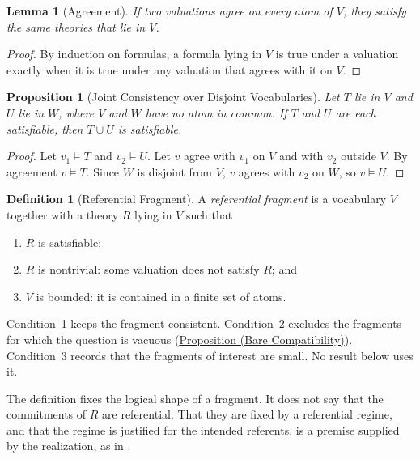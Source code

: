 \documentclass[11pt]{article}
\theoremstyle{plain}
\newtheorem{lemma}[theorem]{Lemma}
\newtheorem{proposition}[theorem]{Proposition}
\theoremstyle{definition}
\newtheorem{definition}[theorem]{Definition}
\theoremstyle{remark}
\newcommand{\PropRef}[2]{\hyperref[#1]{Proposition (#2)}}
\begin{document}
\begin{lemma}[Agreement]
  If two valuations agree on every atom of $V$, they satisfy the same theories
  that lie in $V$.
\end{lemma}

\begin{proof}
  By induction on formulas, a formula lying in $V$ is true under a valuation
  exactly when it is true under any valuation that agrees with it on $V$.
\end{proof}

\begin{proposition}[Joint Consistency over Disjoint Vocabularies]
  \label{se110.proposition.SatisfiableUnionOfDisjoint}
  Let $T$ lie in $V$ and $U$ lie in $W$, where $V$ and $W$ have no atom in
  common.
  If $T$ and $U$ are each satisfiable, then $T \cup U$ is satisfiable.
\end{proposition}

\begin{proof}
  Let $v_1 \models T$ and $v_2 \models U$.
  Let $v$ agree with $v_1$ on $V$ and with $v_2$ outside $V$.
  By agreement $v \models T$.
  Since $W$ is disjoint from $V$, $v$ agrees with $v_2$ on $W$, so
  $v \models U$.
\end{proof}

\begin{definition}[Referential Fragment]
  \label{se110.def.ReferentialFragment}
  A \emph{referential fragment} is a vocabulary $V$ together with a theory $R$
  lying in $V$ such that
  \begin{enumerate}
    \item $R$ is satisfiable;
    \item $R$ is nontrivial: some valuation does not satisfy $R$; and
    \item $V$ is bounded: it is contained in a finite set of atoms.
  \end{enumerate}
\end{definition}

Condition~1 keeps the fragment consistent.
Condition~2 excludes the fragments for which the question is vacuous
(\PropRef{se110.proposition.CompatibleBareIffValid}{Bare Compatibility}).
Condition~3 records that the fragments of interest are small.
No result below uses it.

The definition fixes the logical shape of a fragment.
It does not say that the commitments of $R$ are referential.
That they are fixed by a referential regime, and that the regime is justified
for the intended referents, is a premise supplied by the realization, as in
\citet{case2026neutral}.
\end{document}
